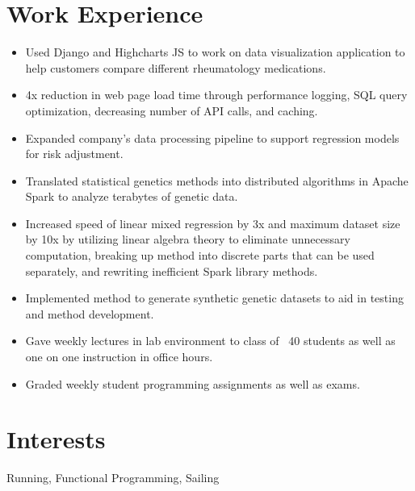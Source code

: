 \documentclass[12pt]{john_resume}
\begin{document}
\section{Work Experience}
\begin{itemize}
	\itemsep0em 
	\item Used Django and Highcharts JS to work on data visualization application to help customers compare different rheumatology medications.
	\item 4x reduction in web page load time through performance logging, SQL query optimization, decreasing number of API calls, and caching.
	\item Expanded company's data processing pipeline to support regression models for risk adjustment.
\end{itemize}
\begin{itemize}
	\itemsep0em 
	\item Translated statistical genetics methods into distributed algorithms in Apache Spark to analyze 
		terabytes of genetic data.
	\item Increased speed of linear mixed regression by 3x and maximum dataset size by 10x by utilizing 
		linear algebra theory to eliminate unnecessary computation, breaking up method into discrete parts 	
		that can be used separately, and rewriting inefficient Spark library methods. 
	\item Implemented method to generate synthetic genetic datasets to aid in testing and method 
		development.
\end{itemize}
\begin{itemize}
	\itemsep0em 
	\item Gave weekly lectures in lab environment to class of ~40 students as well as one on one instruction in office hours. 
	\item Graded weekly student programming assignments as well as exams.
\end{itemize}


\section{Interests}
Running, Functional Programming, Sailing
\end{document}
